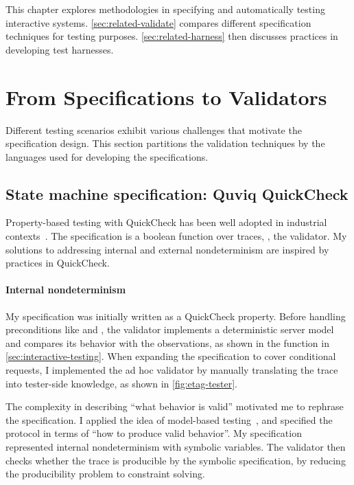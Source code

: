 This chapter explores methodologies in specifying and automatically testing
interactive systems.
\autoref{sec:related-validate} compares different specification
techniques for testing purposes.
\autoref{sec:related-harness} then discusses practices in developing test
harnesses.

\section{From Specifications to Validators}
\label{sec:related-validate}

Different testing scenarios exhibit various challenges that motivate the
specification design.  This section partitions the validation techniques by the
languages used for developing the specifications.

\subsection{State machine specification: Quviq QuickCheck}
Property-based testing with QuickCheck has been well adopted in industrial
contexts~\cite{Hughes2016}.  The specification is a boolean function over traces,
\ie, the validator.  My solutions to addressing internal and external
nondeterminism are inspired by practices in QuickCheck.

\paragraph{Internal nondeterminism}
My \http specification was initially written as a QuickCheck property.  Before
handling preconditions like  and , the
validator implements a deterministic server model and compares its behavior with
the observations, as shown in the  function in
\autoref{sec:interactive-testing}.  When expanding the specification to cover
conditional requests, I implemented the ad hoc validator by manually translating
the trace into tester-side knowledge, as shown in \autoref{fig:etag-tester}.

The complexity in describing ``what behavior is valid'' motivated me to rephrase
the specification.  I applied the idea of model-based
testing~\cite{broy2005model}, and specified the protocol in terms of ``how to
produce valid behavior''.  My specification represented internal nondeterminism
with symbolic variables.  The validator then checks whether the trace is
producible by the symbolic specification, by reducing the producibility problem
to constraint solving.

